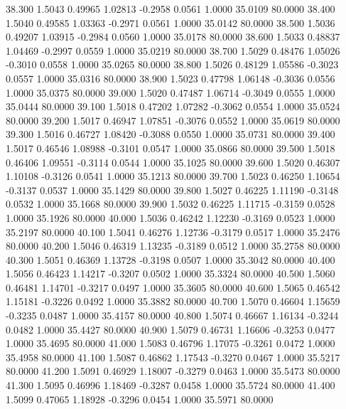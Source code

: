   38.300   1.5043   0.49965   1.02813  -0.2958   0.0561   1.0000  35.0109  80.0000
  38.400   1.5040   0.49585   1.03363  -0.2971   0.0561   1.0000  35.0142  80.0000
  38.500   1.5036   0.49207   1.03915  -0.2984   0.0560   1.0000  35.0178  80.0000
  38.600   1.5033   0.48837   1.04469  -0.2997   0.0559   1.0000  35.0219  80.0000
  38.700   1.5029   0.48476   1.05026  -0.3010   0.0558   1.0000  35.0265  80.0000
  38.800   1.5026   0.48129   1.05586  -0.3023   0.0557   1.0000  35.0316  80.0000
  38.900   1.5023   0.47798   1.06148  -0.3036   0.0556   1.0000  35.0375  80.0000
  39.000   1.5020   0.47487   1.06714  -0.3049   0.0555   1.0000  35.0444  80.0000
  39.100   1.5018   0.47202   1.07282  -0.3062   0.0554   1.0000  35.0524  80.0000
  39.200   1.5017   0.46947   1.07851  -0.3076   0.0552   1.0000  35.0619  80.0000
  39.300   1.5016   0.46727   1.08420  -0.3088   0.0550   1.0000  35.0731  80.0000
  39.400   1.5017   0.46546   1.08988  -0.3101   0.0547   1.0000  35.0866  80.0000
  39.500   1.5018   0.46406   1.09551  -0.3114   0.0544   1.0000  35.1025  80.0000
  39.600   1.5020   0.46307   1.10108  -0.3126   0.0541   1.0000  35.1213  80.0000
  39.700   1.5023   0.46250   1.10654  -0.3137   0.0537   1.0000  35.1429  80.0000
  39.800   1.5027   0.46225   1.11190  -0.3148   0.0532   1.0000  35.1668  80.0000
  39.900   1.5032   0.46225   1.11715  -0.3159   0.0528   1.0000  35.1926  80.0000
  40.000   1.5036   0.46242   1.12230  -0.3169   0.0523   1.0000  35.2197  80.0000
  40.100   1.5041   0.46276   1.12736  -0.3179   0.0517   1.0000  35.2476  80.0000
  40.200   1.5046   0.46319   1.13235  -0.3189   0.0512   1.0000  35.2758  80.0000
  40.300   1.5051   0.46369   1.13728  -0.3198   0.0507   1.0000  35.3042  80.0000
  40.400   1.5056   0.46423   1.14217  -0.3207   0.0502   1.0000  35.3324  80.0000
  40.500   1.5060   0.46481   1.14701  -0.3217   0.0497   1.0000  35.3605  80.0000
  40.600   1.5065   0.46542   1.15181  -0.3226   0.0492   1.0000  35.3882  80.0000
  40.700   1.5070   0.46604   1.15659  -0.3235   0.0487   1.0000  35.4157  80.0000
  40.800   1.5074   0.46667   1.16134  -0.3244   0.0482   1.0000  35.4427  80.0000
  40.900   1.5079   0.46731   1.16606  -0.3253   0.0477   1.0000  35.4695  80.0000
  41.000   1.5083   0.46796   1.17075  -0.3261   0.0472   1.0000  35.4958  80.0000
  41.100   1.5087   0.46862   1.17543  -0.3270   0.0467   1.0000  35.5217  80.0000
  41.200   1.5091   0.46929   1.18007  -0.3279   0.0463   1.0000  35.5473  80.0000
  41.300   1.5095   0.46996   1.18469  -0.3287   0.0458   1.0000  35.5724  80.0000
  41.400   1.5099   0.47065   1.18928  -0.3296   0.0454   1.0000  35.5971  80.0000
